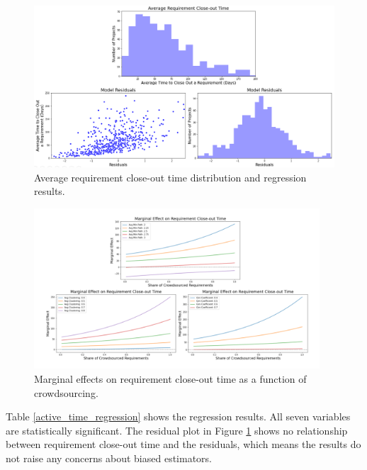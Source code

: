 \begin{figure}
  \includegraphics[width=.95\textwidth]{active_time_results.PNG}
\caption{Average requirement close-out time distribution and regression results.}
\label{active_time_results}
\end{figure}

\begin{figure}
  \includegraphics[width=0.95\textwidth]{active_time_marginal.PNG}
\caption{Marginal effects on requirement close-out time as a function of crowdsourcing.}
\label{active_time_marginal}
\end{figure}

Table \ref{active_time_regression} shows the regression results. All seven variables are statistically significant. The residual plot in Figure \ref{active_time_results} shows no relationship between requirement close-out time and the residuals, which means the results do not raise any concerns about biased estimators.

